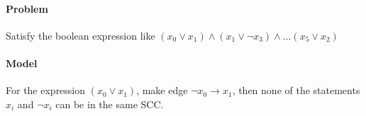 \paragraph{Problem}
Satisfy the boolean expression like $(x_0 \lor x_1) \land (x_1 \lor \neg x_3)\land ... (x_5 \lor x_2)$
\paragraph{Model}
For the expression $(x_0 \lor x_1)$, make edge $\neg x_0 \rightarrow x_1$, then none of the statements $x_i$ and $\neg x_i$ can be in the same SCC.
